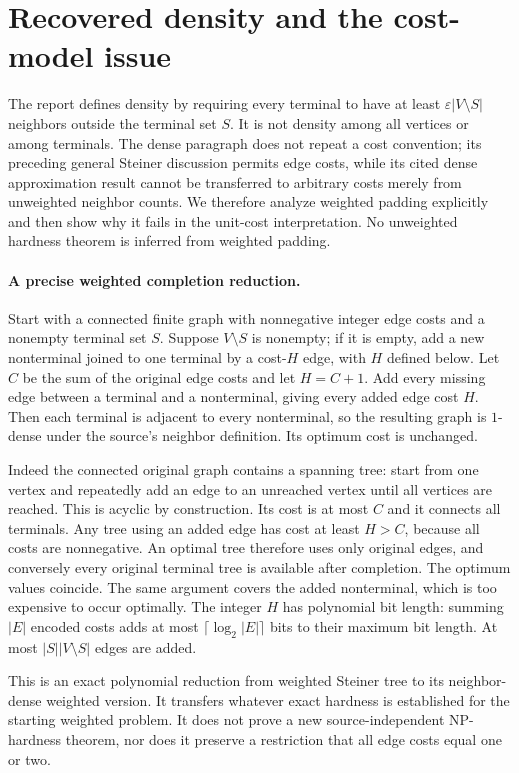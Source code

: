 \documentclass[11pt]{article}
\begin{document}
\section{Recovered density and the cost-model issue}
The report defines density by requiring every terminal to have at
least $\varepsilon|V\setminus S|$ neighbors outside the terminal
set $S$. It is not density among all vertices or among terminals.
The dense paragraph does not repeat a cost convention; its preceding
general Steiner discussion permits edge costs, while its cited dense
approximation result cannot be transferred to arbitrary costs merely
from unweighted neighbor counts. We therefore analyze weighted padding
explicitly and then show why it fails in the unit-cost interpretation.
No unweighted hardness theorem is inferred from weighted padding.

\paragraph{A precise weighted completion reduction.}
Start with a connected finite graph with nonnegative integer edge
costs and a nonempty terminal set $S$. Suppose $V\setminus S$ is nonempty;
if it is empty, add a new nonterminal joined to one terminal by
a cost-$H$ edge, with $H$ defined below. Let $C$ be the
sum of the original edge costs and let $H=C+1$.
Add every missing edge between a terminal and a nonterminal,
giving every added edge cost $H$. Then each terminal is adjacent
to every nonterminal, so the resulting graph is $1$-dense under
the source's neighbor definition. Its optimum cost is unchanged.

Indeed the connected original graph contains a spanning tree: start
from one vertex and repeatedly add an edge to an unreached vertex
until all vertices are reached. This is acyclic by construction.
Its cost is at most $C$ and it connects all terminals. Any tree
using an added edge has cost at least $H>C$, because all costs
are nonnegative. An optimal tree therefore uses only original edges,
and conversely every original terminal tree is available after
completion. The optimum values coincide. The same argument covers
the added nonterminal, which is too expensive to occur optimally.
The integer $H$ has polynomial bit length: summing $|E|$ encoded
costs adds at most $\lceil\log_2|E|\rceil$ bits to their maximum
bit length. At most $|S||V\setminus S|$ edges are added.

This is an exact polynomial reduction from weighted Steiner tree
to its neighbor-dense weighted version. It transfers whatever exact
hardness is established for the starting weighted problem. It does
not prove a new source-independent NP-hardness theorem, nor does it
preserve a restriction that all edge costs equal one or two.
\end{document}
